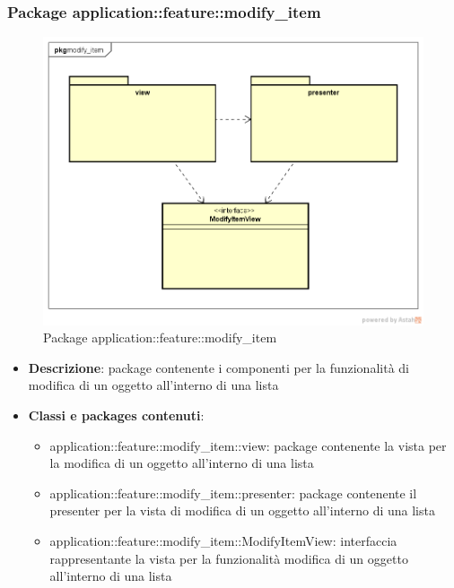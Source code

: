 \subsubsection{Package application::feature::modify\_item}
\label{Package application::feature::modify_item}
\begin{figure}[H]
	\centering
	\includegraphics[scale=0.5]{Sezioni/Packages/Application/modify_item.png}
	\caption{Package application::feature::modify\_item}
\end{figure}
\begin{itemize}
	\item \textbf{Descrizione}: package contenente i componenti per la funzionalità di modifica di un oggetto all'interno di una lista
	\item \textbf{Classi e packages contenuti}:
	\begin{itemize}
	\item application::feature::modify\_item::view: package contenente la vista per la modifica di un oggetto all'interno di una lista
	\item application::feature::modify\_item::presenter: package contenente il presenter per la vista di modifica di un oggetto all'interno di una lista
	\item application::feature::modify\_item::ModifyItemView: interfaccia rappresentante la vista per la funzionalità modifica di un oggetto all'interno di una lista
	\end{itemize}
\end{itemize}

